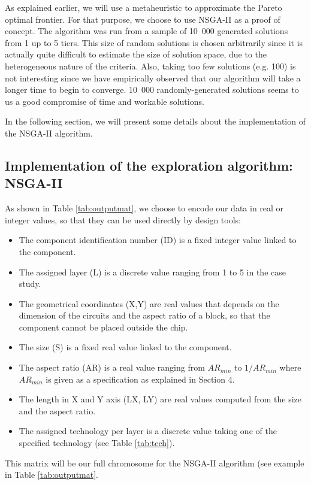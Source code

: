As explained earlier, we will use a metaheuristic to approximate the Pareto optimal frontier. For that purpose, we choose to use NSGA-II \cite{Deb00afast} as a proof of concept. The algorithm was run from a sample of 10~000 generated solutions from 1 up to 5 tiers. This size of random solutions is chosen arbitrarily since it is actually quite difficult to estimate the size of solution space, due to the heterogeneous nature of the criteria. Also, taking too few solutions (e.g. 100) is not interesting since we have empirically observed that our algorithm will take a longer time to begin to converge. 10~000 randomly-generated solutions seems to us a good compromise of time and workable solutions.


In the following section, we will present some details about the implementation of the NSGA-II algorithm.

\subsection{Implementation of the exploration algorithm: NSGA-II}
\label{sec:nsgaii-implement}
As shown in Table \ref{tab:outputmat}, we choose to encode our data in real or integer values, so that they can be used directly by design tools:
\begin{itemize}
\item The component identification number (ID) is a fixed integer value linked to the component.
\item The assigned layer (L) is a discrete value ranging from 1 to 5 in the case study.
\item The geometrical coordinates (X,Y) are real values that depends on the dimension of the circuits and the aspect ratio of a block, so that the component cannot be placed outside the chip.
\item The size (S) is a fixed real value linked to the component.
\item The aspect ratio (AR) is a real value ranging from $AR_{min}$ to $1/AR_{min}$ where $AR_{min}$ is given as a specification as explained in Section 4.
\item The length in X and Y axis (LX, LY) are real values computed from the size and the aspect ratio.
\item The assigned technology per layer is a discrete value taking one of the specified technology (see Table \ref{tab:tech}).
\end{itemize}
This matrix will be our full chromosome for the NSGA-II algorithm (see example in Table \ref{tab:outputmat}.

